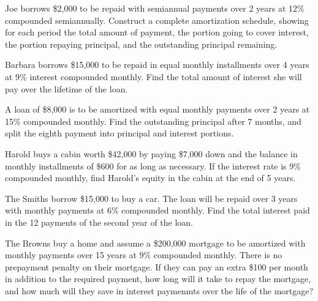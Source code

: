 \documentclass[12pt]{exam}
\begin{document}
\vspace{2in}  %

\begin{questions}

    \question Joe borrows \$2,000 to be repaid with semiannual payments over 2 years at 12\% compounded
    semiannually.  Construct a complete amortization schedule, showing for each period the total amount of payment,
    the portion going to cover interest, the portion repaying principal, and the outstanding principal remaining.
    \vspace{1.5in}

    \question Barbara borrows \$15,000 to be repaid in equal monthly installments over 4 years at 9\%
    interest compounded monthly.  Find the total amount of interest she will pay over the lifetime
    of the loan.
    \vspace{1.25in}

    \question A loan of \$8,000 is to be amortized with equal monthly payments over 2 years at 15\% compounded
    monthly.  Find the outstanding principal after 7 months, and split the eighth payment into principal
    and interest portions.
    \vspace{2in}

    \question Harold buys a cabin worth \$42,000 by paying \$7,000 down and the balance in monthly installments
    of \$600 for as long as necessary.  If the interest rate is 9\% compounded monthly, find Harold's equity
    in the cabin at the end of 5 years.
    \vspace{2in}

    \question The Smiths borrow \$15,000 to buy a car.  The loan will be repaid over 3 years with monthly payments
    at 6\% compounded monthly.  Find the total interest paid in the 12 payments of the second year of the loan.
    \vspace{2.25in}

    \question The Browns buy a home and assume a \$200,000 mortgage to be amortized with monthly payments over
    15 years at 9\% compounded monthly.  There is no prepayment penalty on their mortgage.  If they can pay an
    extra \$100 per month in addition to the required payment, how long will it take to repay the mortgage, and
    how much will they save in interest paymenmts over the life of the mortgage?
    \vspace{1.5in}

\end{questions}
\end{document}
